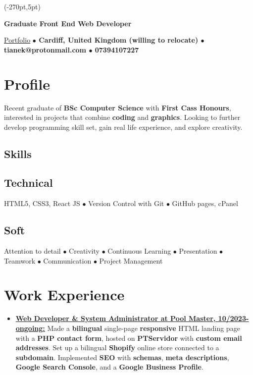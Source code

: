 \documentclass[11pt]{article}
\makeatletter
\newcommand{\verticalline}[1][1pt]{\rule[-0.35ex]{#1}{0.9em}}
\renewcommand{\maketitle}{
\begin{center}
    {\huge\bfseries
    \theauthor \hspace{0.5em}{\verticalline[1.5pt]}\hspace{0.5em}Graduate Front End Web Developer} 

    \vspace{0.7em}

    \ulink{https://orbit-9j.github.io/Portfolio/}{Portfolio} 
    \textbf{$\bullet$  Cardiff, United Kingdom (willing to relocate) $\bullet$ tianek@protonmail.com  $\bullet$ 07394107227}
\end{center}
}
\newcommand{\ulink}[2]{\href{#1}{\uline{#2}}}
\makeatother
\begin{document}
\begin{textblock*}{\paperwidth}(-270pt,5pt)
    \hspace*{\fill}
\end{textblock*}
\vspace*{-0.8cm}
    \author{Rin Tian}
    \maketitle

    \section{Profile}
    Recent graduate of \textbf{BSc Computer Science} with \textbf{First Cass Honours}, interested in projects that combine \textbf{coding} and \textbf{graphics}. Looking to further develop programming skill set, gain real life experience, and explore creativity. 

    \begin{center}
        \section{Skills} 
        \subsection{Technical}
    HTML5, CSS3, React JS $\bullet$ Version Control with Git $\bullet$ GitHub pages, cPanel 
        
        \subsection{Soft}Attention to detail $\bullet$ Creativity $\bullet$ Continuous Learning $\bullet$
        Presentation $\bullet$ Teamwork $\bullet$ Communication $\bullet$ Project Management 
    \end{center}
   
    \section{Work Experience}
    \begin{itemize}[itemsep=3pt, leftmargin=1em]
        \item \ulink{https://poolmaster.pt/} {\textbf{Web Developer \& System Administrator at Pool Master, 10/2023-ongoing:}} Made a \textbf{bilingual} single-page \textbf{responsive} HTML landing page with a \textbf{PHP contact form}, hosted on \textbf{PTServidor} with \textbf{custom email addresses}. Set up a bilingual \textbf{Shopify} online store connected to a \textbf{subdomain}. Implemented \textbf{SEO} with \textbf{schemas}, \textbf{meta descriptions}, \textbf{Google Search Console}, and a \textbf{Google Business Profile}.
    \end{itemize}
\end{document}
